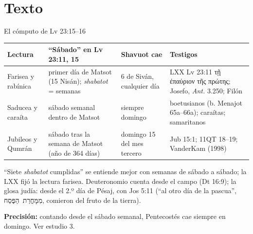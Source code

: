 \documentclass[hyperref={bookmarks=false},aspectratio=169]{beamer}
\newcommand{\heb}[1]{\mbox{\foreignlanguage{hebrew}{#1}}}
\newcommand{\grc}[1]{\foreignlanguage{ancientgreek}{#1}}
\newcommand{\precision}[1]{{\footnotesize\color{sepia}\textbf{Precisión:} #1}}
\begin{document}
\section{Texto}

\begin{frame}{El cómputo de Lv 23:15--16}
\scriptsize\renewcommand{\arraystretch}{1.18}
\begin{tabular}{@{}L{2.3cm}L{3.5cm}L{2.3cm}L{3.4cm}@{}}
\toprule
\textbf{Lectura} & \textbf{``Sábado'' en Lv 23:11, 15} & \textbf{Shavuot cae} & \textbf{Testigos} \\ \midrule
Farisea y rabínica & primer día de Matsot (15 Nisán); \emph{shabatot} = semanas & 6 de Siván, cualquier día & LXX Lv 23:11 \grc{τῇ ἐπαύριον τῆς πρώτης}; Josefo, \emph{Ant.} 3.250; Filón \\
Saducea y caraíta & sábado semanal dentro de Matsot & siempre domingo & boetusianos (b. Menajot 65a--66a); caraítas; samaritanos \\
Jubileos y Qumrán & sábado tras la semana de Matsot (año de 364 días) & domingo 15 del mes tercero & Jub 15:1; 11QT 18--19; VanderKam (1998) \\
\bottomrule
\end{tabular}\par\medskip
\small\RaggedRight ``Siete \emph{shabatot} cumplidas'' se entiende mejor con semanas de sábado a sábado; la LXX fijó la lectura farisea. Deuteronomio cuenta desde el campo (Dt 16:9); la glosa judía: desde el 2.º día de Pésaj, con Jos 5:11 (``al otro día de la pascua'', \heb{מִמָּחֳרַת הַפֶּסַח}, comieron del fruto de la tierra).\par\smallskip
\precision{contando desde el sábado semanal, Pentecostés cae siempre en domingo. Ver estudio 3.}
\end{frame}
\end{document}
